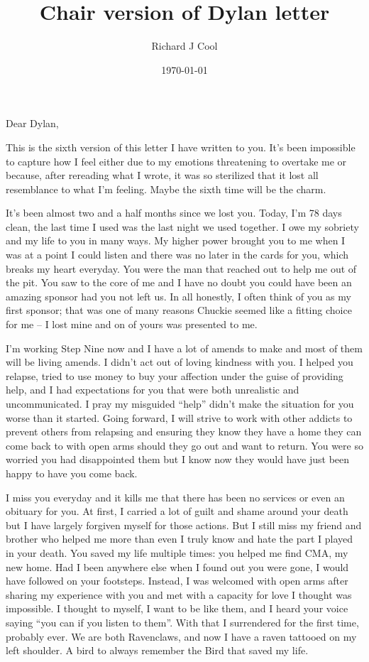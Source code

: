 \documentclass[11pt]{article}
\author{Richard J Cool}
\date{\today}
\title{Chair version of Dylan letter}
\begin{document}
\maketitle
\tableofcontents

Dear Dylan,

This is the sixth version of this letter I have written to you.  It's been impossible to capture how I feel either due to my emotions threatening to overtake me or because, after rereading what I wrote, it was so sterilized that it lost all resemblance to what I'm feeling.   Maybe the sixth time will be the charm.

It's been almost two and a half months since we lost you. Today, I'm 78 days clean, the last time I used was the last night we used together.  I owe my sobriety and my life to you in many ways.  My higher power brought you to me when I was at a point I could listen and there was no later in the cards for you, which breaks my heart everyday.  You were the man that reached out to help me out of the pit.  You saw to the core of me and I have no doubt you could have been an amazing sponsor had you not left us.  In all honestly, I often think of you as my first sponsor; that was one of many reasons Chuckie seemed like a fitting choice for me -- I lost mine and on of yours was presented to me.

I'm working Step Nine now and I have a lot of amends to make and most of them will be living amends.  I didn't act out of loving kindness with you.  I helped you relapse, tried to use money to buy your affection under the guise of providing help, and I had expectations for you that were both unrealistic and uncommunicated.  I pray my misguided ``help'' didn't make the situation for you worse than it started.  Going forward, I will strive to work with other addicts to prevent others from relapsing and ensuring they know they have a home they can come back to with open arms should they go out and want to return.  You were so worried you had disappointed them but I know now they would have just been happy to have you come back.

I miss you everyday and it kills me that there has been no services or even an obituary for you. At first, I carried a lot of guilt and shame around your death but I have largely forgiven myself for those actions.  But I still miss my friend and brother who helped me more than even I truly know and hate the part I played in your death.  You saved my life multiple times: you helped me find CMA, my new home.  Had I been anywhere else when I found out you were gone, I would have followed on your footsteps.  Instead, I was welcomed with open arms after sharing my experience with you and met with a capacity for love I thought was impossible.  I thought to myself, I want to be like them, and I heard your voice saying ``you can if you listen to them''.  With that I surrendered for the first time, probably ever.  We are both Ravenclaws, and now I have a raven tattooed on my left shoulder. A bird to always remember the Bird that saved my life.
\end{document}
